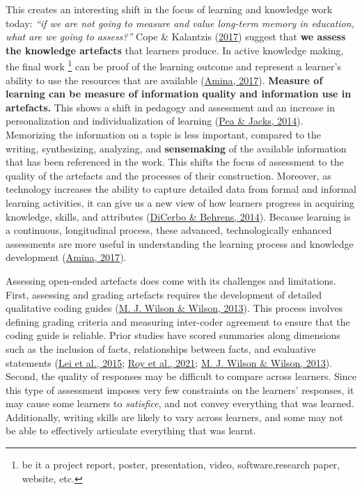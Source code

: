 \documentclass[letterpaper, nobind]{templates/ociamthesis}
\begin{document}
This creates an interesting shift in the focus of learning and knowledge
work today: \emph{``if we are not going to measure and value long-term memory in education, what are we going to assess?''}
Cope \& Kalantzis (\protect\hyperlink{ref-cope2017elearningc}{2017}) suggest that \textbf{we assess the knowledge artefacts} that learners
produce. In active knowledge making, the final work \footnote{
  be it a project report, poster, presentation, video, software,research paper, website, etc.} can be proof of
the learning outcome and represent a learner's ability to use the
resources that are available (\protect\hyperlink{ref-amina2017active}{Amina, 2017}). \textbf{Measure of learning can be measure of information quality and information use in artefacts.} This shows a shift in pedagogy and assessment and an
increase in personalization and individualization of learning
(\protect\hyperlink{ref-pea2014learning}{Pea \& Jacks, 2014}). Memorizing the information on a topic is less
important, compared to the writing, synthesizing, analyzing, and
\textbf{sensemaking} of the available information that has been referenced in
the work. This shifts the focus of assessment to the quality of the
artefacts and the processes of their construction. Moreover, as
technology increases the ability to capture detailed data from formal
and informal learning activities, it can give us a new view of how
learners progress in acquiring knowledge, skills, and attributes
(\protect\hyperlink{ref-dicerbo2014impacts}{DiCerbo \& Behrens, 2014}). Because learning is a continuous, longitudinal
process, these advanced, technologically enhanced assessments are more
useful in understanding the learning process and knowledge development
(\protect\hyperlink{ref-amina2017active}{Amina, 2017}).

Assessing open-ended artefacts does come with its challenges and
limitations. First, assessing and grading artefacts requires the
development of detailed qualitative coding guides
(\protect\hyperlink{ref-wilson2013comparison}{M. J. Wilson \& Wilson, 2013}). This process involves defining grading criteria
and measuring inter-coder agreement to ensure that the coding guide is
reliable. Prior studies have scored summaries along dimensions such as
the inclusion of facts, relationships between facts, and evaluative
statements (\protect\hyperlink{ref-lei2015effect}{Lei et al., 2015}; \protect\hyperlink{ref-roy2021note}{Roy et al., 2021}; \protect\hyperlink{ref-wilson2013comparison}{M. J. Wilson \& Wilson, 2013}).
Second, the quality of responses may be difficult to compare across
learners. Since this type of assessment imposes very few constraints on
the learners' responses, it may cause some learners to \emph{satisfice}, and
not convey everything that was learned. Additionally, writing skills are
likely to vary across learners, and some may not be able to effectively
articulate everything that was learnt.
\end{document}
